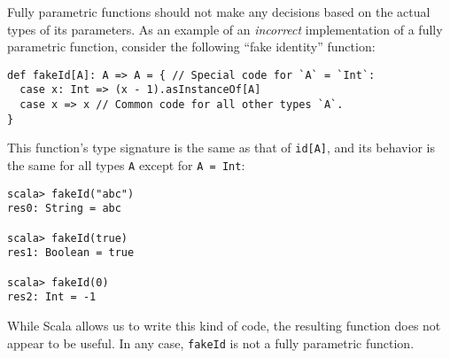 Fully parametric functions should not make any decisions based on
the actual types of its parameters. As an example of an \emph{incorrect}
implementation of a fully parametric function, consider the following
``fake identity'' function:
\begin{lstlisting}
def fakeId[A]: A => A = { // Special code for `A` = `Int`:
  case x: Int => (x - 1).asInstanceOf[A]
  case x => x // Common code for all other types `A`.
}
\end{lstlisting}
This function's type signature is the same as that of \lstinline!id[A]!,
and its behavior is the same for all types \lstinline!A!
except for \lstinline!A = Int!:
\begin{lstlisting}
scala> fakeId("abc")
res0: String = abc

scala> fakeId(true)
res1: Boolean = true

scala> fakeId(0)
res2: Int = -1
\end{lstlisting}
While Scala allows us to write this kind of code, the resulting function
does not appear to be useful. In any case, \lstinline!fakeId!
is not a fully parametric function.

